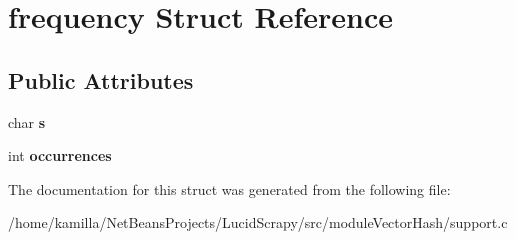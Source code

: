 \hypertarget{structfrequency}{
\section{frequency Struct Reference}
\label{structfrequency}
}
\subsection*{Public Attributes}
\begin{DoxyCompactItemize}
\item 
\hypertarget{structfrequency_a255b994c978dd69715fdb9870e553cd2}{
char {\bfseries s}}
\label{structfrequency_a255b994c978dd69715fdb9870e553cd2}

\item 
\hypertarget{structfrequency_af92c7576c0a63d227b86b08fa1ed90b5}{
int {\bfseries occurrences}}
\label{structfrequency_af92c7576c0a63d227b86b08fa1ed90b5}

\end{DoxyCompactItemize}


The documentation for this struct was generated from the following file:\begin{DoxyCompactItemize}
\item 
/home/kamilla/NetBeansProjects/LucidScrapy/src/moduleVectorHash/support.c\end{DoxyCompactItemize}
